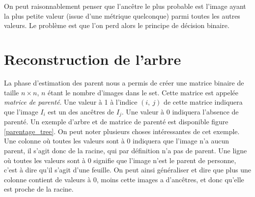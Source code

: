 \documentclass[utf8,final]{stageM2R} %
\begin{document}
On peut raisonnablement penser que l'ancêtre le plus probable est l'image ayant la plus petite valeur (issue d'une métrique quelconque) parmi toutes les autres valeurs. Le problème est que l'on perd alors le principe de décision binaire.

\section{Reconstruction de l'arbre}
La phase d'estimation des parent nous a permis de créer une matrice binaire de taille $n\times n$, $n$ étant le nombre d'images dans le set. Cette matrice est appelée \textit{matrice de parenté}. Une valeur à 1 à l'indice $(i,\ j)$ de cette matrice indiquera que l'image $I_i$ est un des ancêtres de $I_j$. Une valeur à 0 indiquera l'absence de parenté. Un exemple d'arbre et de matrice de parenté est disponible figure \ref{parentage_tree}. On peut noter plusieurs choses intéressantes de cet exemple. Une colonne où toutes les valeurs sont à 0 indiquera que l'image n'a aucun parent, il s'agit donc de la racine, qui par définition n'a pas de parent. Une ligne où toutes les valeurs sont à 0 signifie que l'image n'est le parent de personne, c'est à dire qu'il s'agit d'une feuille. On peut ainsi généraliser et dire que plus une colonne contient de valeurs à 0, moins cette images a d'ancêtres, et donc qu'elle est proche de la racine.
\end{document}
